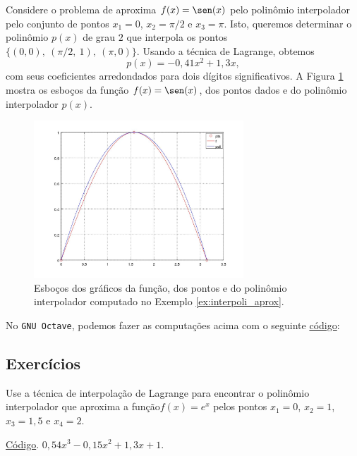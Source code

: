 \begin{ex}\label{ex:interpoli_aprox}
  Considere o problema de aproxima $f(x) = \sen(x)$ pelo polinômio interpolador pelo conjunto de pontos $x_1=0$, $x_2=\pi/2$ e $x_3=\pi$. Isto, queremos determinar o polinômio $p(x)$ de grau $2$ que interpola os pontos $\{(0,0),~(\pi/2,~1),~(\pi,0)\}$. Usando a técnica de Lagrange, obtemos
  \begin{equation}
    p(x) = -0,41x^2 + 1,3x,
  \end{equation}
com seus coeficientes arredondados para dois dígitos significativos. A Figura \ref{fig:interpoli_aprox} mostra os esboços da função $f(x)=\sen(x)$, dos pontos dados e do polinômio interpolador $p(x)$.

\begin{figure}[h!]
  \centering
  \includegraphics[width=0.7\textwidth]{./cap_interp/dados/ex_interpoli_aprox/fig_interpoli_aprox}
  \caption{Esboços dos gráficos da função, dos pontos e do polinômio interpolador computado no Exemplo \ref{ex:interpoli_aprox}.}
  \label{fig:interpoli_aprox}
\end{figure}

\ifisoctave
No \verb+GNU Octave+, podemos fazer as computações acima com o seguinte \href{https://github.com/phkonzen/notas/blob/master/src/MatematicaNumerica/cap_interp/dados/ex_interpoli_aprox/ex_interpoli_aprox.m}{código}:

\fi
\end{ex}

\subsection*{Exercícios}

\begin{exer}
  Use a técnica de interpolação de Lagrange para encontrar o polinômio interpolador que aproxima a função$f(x)=e^{x}$ pelos pontos $x_1=0$, $x_2=1$, $x_3=1,5$ e $x_4=2$.
\end{exer}
\begin{resp}
\ifisoctave
\href{https://github.com/phkonzen/notas/blob/master/src/MatematicaNumerica/cap_interp/dados/exer_interpoli_aprox1/exer_interpoli_aprox1.m}{Código}.
\fi
$0,54x^3 - 0,15x^2 + 1,3x + 1$.
\end{resp}


